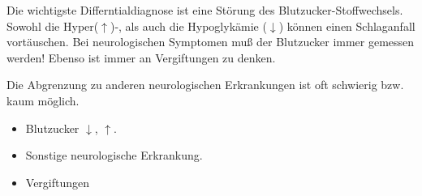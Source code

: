{
Die wichtigste Differntialdiagnose ist eine Störung des
Blutzucker-Stoffwechsels. Sowohl die Hyper(${\uparrow}$)-, als auch die
Hypoglykämie (${\downarrow}$) können einen Schlaganfall vortäuschen. Bei
neurologischen Symptomen muß der Blutzucker immer gemessen werden!
Ebenso ist immer an Vergiftungen zu denken.

Die Abgrenzung zu anderen neurologischen Erkrankungen ist oft schwierig bzw.
kaum möglich.
}{
\begin{itemize}
  \item Blutzucker ${\downarrow}$, ${\uparrow}$.
  \item Sonstige neurologische Erkrankung.
  \item Vergiftungen
\end{itemize}

}{}{}{}


